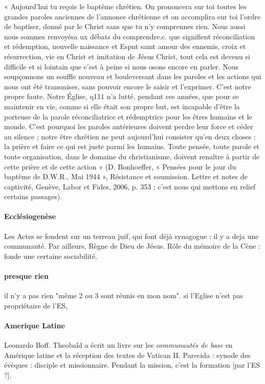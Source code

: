 \begin{singlequote}
    « Aujourd'hui tu reçois le baptême chrétien. On prononcera sur toi
toutes les grandes paroles anciennes de l'annonce chrétienne et on accomplira sur toi l'ordre de baptiser, donné par le Christ sans que tu n'y comprennes rien. Nous aussi nous sommes renvoyésa ux débats du comprendre.c.
que signifient réconciliation et rédemption, nouvelle naissance et Espnt samt
amour des ennemis, croix et résurrection, vie en Christ et imitation de Jésus
Christ, tout cela est devenu si difficile et si lointain que c'est à peine si nous
osons encore en parler. Nous soupçonnons un souffle nouveau et bouleversant dans les paroles et les actions qui nous ont été transmises, sans pouvoir
encore le saisir et l'exprimer. C'est notre propre faute. Notre Église, q111
n'a lutté, pendant ces années, que pour se maintenir en vie, comme si elle était
son propre but, est incapable d'être la porteuse de la parole réconciliatrice et
rédemptrice pour les êtres humains et le monde. C'est pourquoi les paroles
antérieures doivent perdre leur force et céder au silence ; notre être chrétien ne
peut aujourd'hui consister qu'en deux choses : la prière et faire ce qui est juste
parmi les humains. Toute pensée, toute parole et toute organisation, dans
le domaine du christianisme, doivent renaître à partir de cette prière et de
cette action » (D. Bonhoeffer, « Pensées pour le jour du baptême de D.W.R.,
Mai 1944 », Résistance et soumission. Lettre et notes de captivité, Genève, Labor
et Fides, 2006, p. 353 ; c'est nous qui mettons en relief certains passages).
\end{singlequote}


\paragraph{Ecclésiogenèse} Les Actes se fondent sur un terreau juif, qui font déjà synagogue : il y a deja une communauté.  Par ailleurs, Règne de Dieu de Jésus. Rôle du mémoire de la Cène : fonde une certaine sociabilité. 


\paragraph{presque rien} il n'y a pas rien "même 2 ou 3 sont réunis en mon nom". 
si l'Eglise n'est pas propriétaire de l'ES, 

\paragraph{Amerique Latine} Leonardo Boff. Theobald a écrit un livre sur les \textit{communautés de base} en Amérique latine et la réception des textes de Vatican II. Parecida : synode des évèques : disciple et missionnaire. Pendant la mission, c'est la formation [par l'ES ?].

